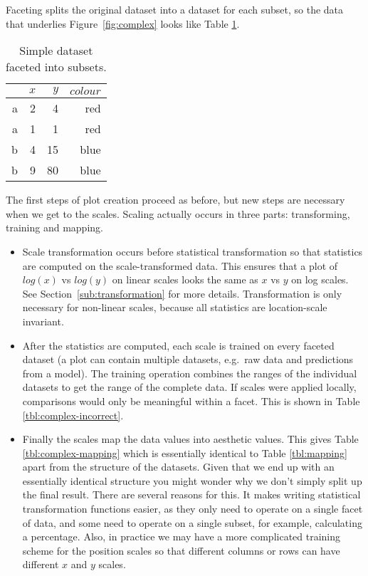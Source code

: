 Faceting splits the original dataset into a dataset for each subset, so the data that underlies Figure~\ref{fig:complex} looks like Table \ref{tbl:complex}.

\begin{table}[ht]
	\centering
	\begin{tabular}{r|r|r|r}
		& $x$ & $y$ & $colour$\\
		\hline
		a & 2 & 4 & red\\
		a & 1 & 1 & red\\
		\hline \hline
		b & 4 & 15 & blue\\
		b & 9 & 80 & blue
	\end{tabular}

	\caption{Simple dataset faceted into subsets.}
	\label{tbl:complex}
\end{table}

The first steps of plot creation proceed as before, but new steps are necessary when we get to the scales.   Scaling actually occurs in three parts: transforming, training and mapping. 

\begin{itemize}
	\item  Scale transformation occurs before statistical transformation so that statistics are computed on the scale-transformed data.  This ensures that a plot of $log(x)$ vs $log(y)$ on linear scales looks the same as $x$ vs $y$ on log scales.  See Section~\ref{sub:transformation} for more details. Transformation is only necessary for non-linear scales, because all statistics are location-scale invariant.

	\item After the statistics are computed, each scale is trained on every faceted dataset (a plot can contain multiple datasets, e.g.\ raw data and predictions from a model).  The training operation combines the ranges of the individual datasets to get the range of the complete data.  If scales were applied locally, comparisons would only be meaningful within a facet.  This is shown in Table \ref{tbl:complex-incorrect}.

	\item Finally the scales map the data values into aesthetic values.  This gives Table \ref{tbl:complex-mapping} which is essentially identical to Table \ref{tbl:mapping} apart from the structure of the datasets.  Given that we end up with an essentially identical structure you might wonder why we don't simply split up the final result.  There are several reasons for this.  It makes writing statistical transformation functions easier, as they only need to operate on a single facet of data, and some need to operate on a single subset, for example, calculating a percentage.  Also, in practice we may have a more complicated training scheme for the position scales so that different columns or rows can have different $x$ and $y$ scales.  
	
\end{itemize}


